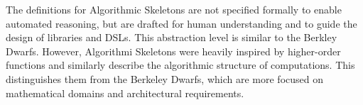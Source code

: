     The definitions for Algorithmic Skeletons are not specified formally to
    enable automated reasoning, but are drafted for human understanding and to
    guide the design of libraries and DSLs.
    This abstraction level is similar to the Berkley Dwarfs.
    However, Algorithmi Skeletons were heavily inspired by higher-order
    functions and similarly describe the algorithmic structure of computations.
    This distinguishes them from the Berkeley Dwarfs, which are more focused on
    mathematical domains and architectural requirements.
